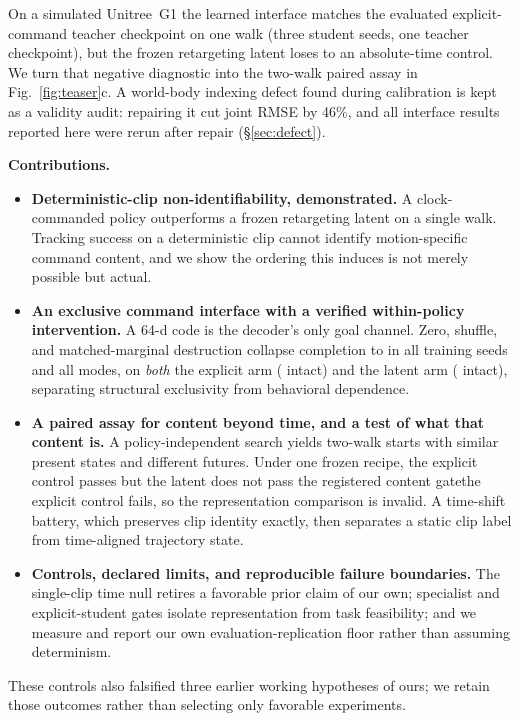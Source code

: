 \documentclass[conference]{IEEEtran}
\newif\ifeexplicitvalid
\newif\ifepositivecontent
\begin{document}
On a simulated Unitree~G1 the learned interface matches the evaluated
explicit-command teacher checkpoint on one walk (three student seeds, one teacher
checkpoint), but the frozen retargeting latent loses to an absolute-time control.  We
turn that negative diagnostic into the two-walk paired assay in
Fig.~\ref{fig:teaser}c.  A world-body indexing defect found during calibration is kept
as a validity audit: repairing it cut joint RMSE by 46\%, and all interface results
reported here were rerun after repair (\S\ref{sec:defect}).

\textbf{Contributions.}
\begin{itemize}
\item \textbf{Deterministic-clip non-identifiability, demonstrated.}  A clock-commanded
  policy outperforms a frozen retargeting latent on a single walk.  Tracking success on a
  deterministic clip cannot identify motion-specific command content, and we show the
  ordering this induces is not merely possible but actual.
\item \textbf{An exclusive command interface with a verified within-policy intervention.}
  A 64-d code is the decoder's only goal channel.  Zero, shuffle, and matched-marginal
  destruction collapse completion to \EDestroyCompletion{} in all \EDestroySeeds{} training
  seeds and all \EDestroyModes{} modes, on \emph{both} the explicit arm
  (\EDestroyBaselineCompletion{} intact) and the latent arm
  (\EDestroySnmrBaselineCompletion{} intact), separating structural exclusivity from
  behavioral dependence.
\item \textbf{A paired assay for content beyond time, and a test of what that content is.}
  A policy-independent search yields \ESelectedWindows{} two-walk starts with similar
  present states and different futures.  Under one frozen recipe,
  \ifeexplicitvalid\ifepositivecontent the latent passes the registered content gate over
  absolute time and phase-matched shuffled content\else the explicit control passes but the
  latent does not pass the registered content gate\fi\else the explicit control fails, so
  the representation comparison is invalid\fi.  A time-shift battery, which preserves clip
  identity exactly, then separates a static clip label from time-aligned trajectory state.
\item \textbf{Controls, declared limits, and reproducible failure boundaries.}  The
  single-clip time null retires a favorable prior claim of our own; specialist and
  explicit-student gates isolate representation from task feasibility; and we measure and
  report our own evaluation-replication floor rather than assuming determinism.
\end{itemize}
These controls also falsified three earlier working hypotheses of ours; we retain those
outcomes rather than selecting only favorable experiments.
\end{document}
